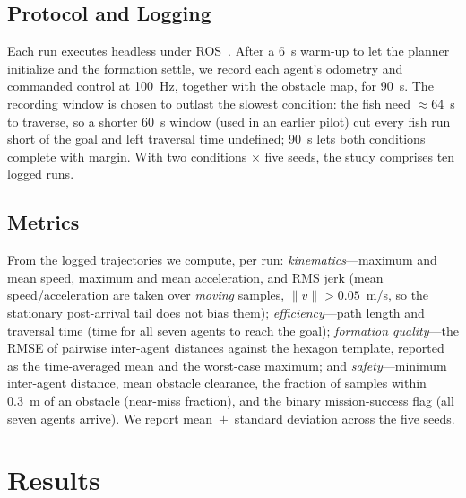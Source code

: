 \documentclass[journal]{IEEEtran}
\begin{document}
\subsection{Protocol and Logging}
Each run executes headless under ROS~\cite{quigley2009ros}. After a 6~s
warm-up to let the planner initialize and the formation settle, we record
each agent's odometry and commanded control at 100~Hz, together with the
obstacle map, for 90~s. The recording window is chosen to outlast the slowest
condition: the fish need $\approx$64~s to traverse, so a shorter 60~s window
(used in an earlier pilot) cut every fish run short of the goal and left
traversal time undefined; 90~s lets both conditions complete with margin.
With two conditions $\times$ five seeds, the study comprises ten logged runs.

\subsection{Metrics}
From the logged trajectories we compute, per run:
\emph{kinematics}---maximum and mean speed, maximum and mean acceleration,
and RMS jerk (mean speed/acceleration are taken over \emph{moving} samples,
$\lVert v\rVert>0.05$~m/s, so the stationary post-arrival tail does not bias
them); \emph{efficiency}---path length and traversal time (time for all seven
agents to reach the goal); \emph{formation quality}---the RMSE of pairwise
inter-agent distances against the hexagon template, reported as the
time-averaged mean and the worst-case maximum; and \emph{safety}---minimum
inter-agent distance, mean obstacle clearance, the fraction of samples within
0.3~m of an obstacle (near-miss fraction), and the binary mission-success
flag (all seven agents arrive). We report mean~$\pm$~standard deviation across
the five seeds.

\section{Results}
\label{sec:results}
\end{document}
